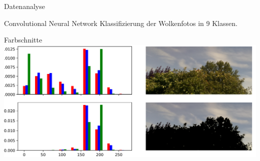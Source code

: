 \begin{frame}[t]{Datenanalyse}
  \begin{block}{Convolutional Neural Network}
    Klassifizierung der Wolkenfotos in 9 Klassen.
  \end{block}
	\begin{block}{Farbschnitte}
		\centering
		\includegraphics[width=0.95\linewidth]{picture/cut_hist.png}
	\end{block}
\end{frame}
